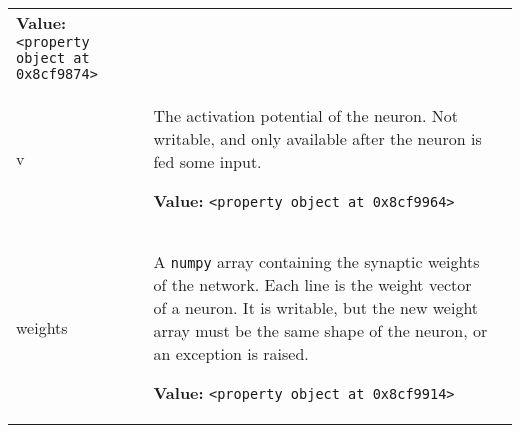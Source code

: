 \begin{longtable}{|p{}|p{}|l}
\textbf{Value:} 
{\tt {\textless}property object at 0x8cf9874{\textgreater}}&\\
\cline{1-2}
\raggedright v\- & \raggedright The activation potential of the neuron. Not writable, and only available
after the neuron is fed some input.

\textbf{Value:} 
{\tt {\textless}property object at 0x8cf9964{\textgreater}}&\\
\cline{1-2}
\raggedright w\-e\-i\-g\-h\-t\-s\- & \raggedright A \texttt{numpy} array containing the synaptic weights of the network. Each
line is the weight vector of a neuron. It is writable, but the new weight
array must be the same shape of the neuron, or an exception is raised.

\textbf{Value:} 
{\tt {\textless}property object at 0x8cf9914{\textgreater}}&\\
\cline{1-2}
\end{longtable}

